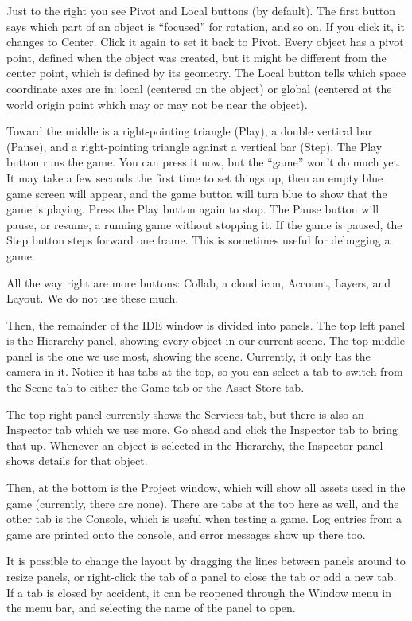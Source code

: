 \documentclass[12pt]{amsbook}
\theoremstyle{definition}
\theoremstyle{remark}
\numberwithin{figure}{chapter}
\numberwithin{table}{chapter}
\numberwithin{section}{chapter}
\numberwithin{equation}{section}
\begin{document}
Just to the right you see Pivot and Local buttons (by default).  The first button says which part of an object is ``focused'' for rotation, and so on.  If you click it, it changes to Center.  Click it again to set it back to Pivot.  Every object has a pivot point, defined when the object was created, but it might be different from the center point, which is defined by its geometry.  The Local button tells which space coordinate axes are in: local (centered on the object) or global (centered at the world origin point which may or may not be near the object).

Toward the middle is a right-pointing triangle (Play), a double vertical bar (Pause), and a right-pointing triangle against a vertical bar (Step).  The Play button runs the game.  You can press it now, but the ``game'' won't do much yet.  It may take a few seconds the first time to set things up, then an empty blue game screen will appear, and the game button will turn blue to show that the game is playing.  Press the Play button again to stop.  The Pause button will pause, or resume, a running game without stopping it.  If the game is paused, the Step button steps forward one frame.  This is sometimes useful for debugging a game.

All the way right are more buttons: Collab, a cloud icon, Account, Layers, and Layout.  We do not use these much.

Then, the remainder of the IDE window is divided into panels.  The top left panel is the Hierarchy panel, showing every object in our current scene.  The top middle panel is the one we use most, showing the scene.  Currently, it only has the camera in it.  Notice it has tabs at the top, so you can select a tab to switch from the Scene tab to either the Game tab or the Asset Store tab.

The top right panel currently shows the Services tab, but there is also an Inspector tab which we use more.  Go ahead and click the Inspector tab to bring that up.  Whenever an object is selected in the Hierarchy, the Inspector panel shows details for that object.

Then, at the bottom is the Project window, which will show all assets used in the game (currently, there are none).  There are tabs at the top here as well, and the other tab is the Console, which is useful when testing a game.  Log entries from a game are printed onto the console, and error messages show up there too.

It is possible to change the layout by dragging the lines between panels around to resize panels, or right-click the tab of a panel to close the tab or add a new tab.  If a tab is closed by accident, it can be reopened through the Window menu in the menu bar, and selecting the name of the panel to open.
\end{document}
